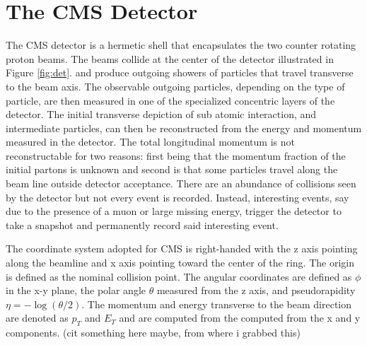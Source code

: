


\section{The CMS Detector}

The CMS detector is a hermetic shell that encapsulates the two counter rotating proton beams. The beams collide at the center of the detector illustrated in Figure \ref{fig:det}. and produce outgoing showers of particles that travel transverse to the beam axis. The observable outgoing particles, depending on the type of particle, are then measured in one of the specialized concentric layers of the detector. The initial transverse depiction of sub atomic interaction, and intermediate particles, can then be reconstructed from the energy and momentum measured in the detector. The total longitudinal momentum is not reconstructable for two reasons: first being that the momentum fraction of the initial partons is unknown and second is that some particles travel along the beam line outside detector acceptance.  There are an abundance of collisions seen by the detector but not every event is recorded. Instead, interesting events, say due to the presence of a muon or large missing energy, trigger the detector to take a snapshot and permanently record said interesting event.

The coordinate system adopted for CMS is right-handed with the z axis pointing along the beamline and x axis pointing toward the center of the ring. The origin is defined as the nominal collision point. The angular coordinates are defined as $\phi$ in the x-y plane, the polar angle $\theta$ measured from the z axis, and pseudorapidity $\eta =-\log(\theta/2)$. The momentum and energy transverse to the beam direction are denoted as $p_T$ and $E_T$ and are computed from the computed from the x and y components. (cit something here maybe, from where i grabbed this)

